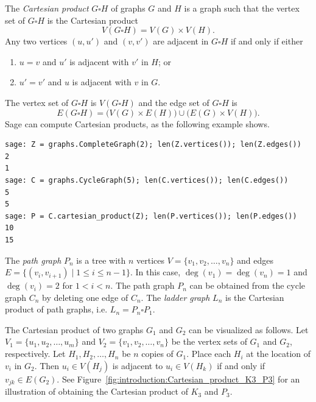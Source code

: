 The \emph{Cartesian product}
$G \square H$\index{$\square$} of graphs $G$ and $H$ is a graph such
that the vertex set of $G \square H$ is the Cartesian product
\[
V(G \square H) = V(G) \times V(H).
\]
Any two vertices $(u, u')$ and $(v, v')$
are adjacent in $G \square H$ if and only if either
\begin{enumerate}
\item $u = v$ and $u'$ is adjacent with $v'$ in $H$; or

\item $u' = v'$ and $u$ is adjacent with $v$ in $G$.
\end{enumerate}
The vertex set of $G \square H$ is $V(G \square H)$
and the edge set of $G \square H$ is
\[
E(G \square H)
=
\big(V(G) \times E(H)\big) \cup \big(E(G) \times V(H)\big).
\]
Sage can compute Cartesian products, as the following example shows.
\begin{lstlisting}
sage: Z = graphs.CompleteGraph(2); len(Z.vertices()); len(Z.edges())
2
1
sage: C = graphs.CycleGraph(5); len(C.vertices()); len(C.edges())
5
5
sage: P = C.cartesian_product(Z); len(P.vertices()); len(P.edges())
10
15
\end{lstlisting}

The \emph{path graph} $P_n$ is a tree
with $n$ vertices $V = \{v_1, v_2, \dots, v_n\}$ and edges
$E = \{ (v_i, v_{i+1}) \;|\; 1 \leq i \leq n-1 \}$. In this case,
$\deg(v_1) = \deg(v_n) = 1$ and $\deg(v_i) = 2$ for $1 < i < n$. The
path graph $P_n$ can be obtained from the cycle graph $C_n$ by
deleting one edge of $C_n$. The
\emph{ladder graph} $L_n$ is the
Cartesian product of path graphs, i.e. $L_n = P_n \square P_1$.

The Cartesian product of two graphs $G_1$ and $G_2$ can be visualized
as follows. Let $V_1 = \{u_1, u_2, \dots, u_m\}$ and
$V_2 = \{v_1, v_2, \dots, v_n\}$ be the vertex sets of $G_1$ and
$G_2$, respectively. Let $H_1, H_2, \dots, H_n$ be $n$ copies of
$G_1$. Place each $H_i$ at the location of $v_i$ in $G_2$. Then
$u_i \in V(H_j)$ is adjacent to $u_i \in V(H_k)$ if and only if
$v_{jk} \in E(G_2)$. See
Figure~\ref{fig:introduction:Cartesian_product_K3_P3} for an
illustration of obtaining the Cartesian product of $K_3$ and $P_3$.

